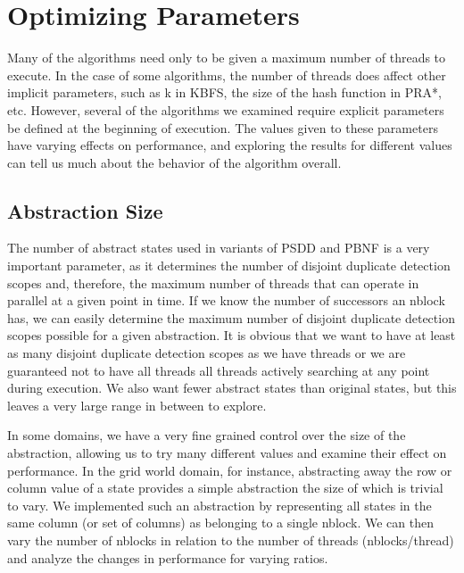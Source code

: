 \documentclass{article}
\begin{document}
\section{Optimizing Parameters}
Many of the algorithms need only to be given a maximum number of threads to execute. In the case of some algorithms, the number of threads does affect other implicit parameters, such as k in KBFS, the size of the hash function in PRA*, etc. However, several of the algorithms we examined require explicit parameters be defined at the beginning of execution. The values given to these parameters have varying effects on performance, and exploring the results for different values can tell us much about the behavior of the algorithm overall.
\subsection{Abstraction Size}
The number of abstract states used in variants of PSDD and PBNF is a very important parameter, as it determines the number of disjoint duplicate detection scopes and, therefore, the maximum number of threads that can operate in parallel at a given point in time. If we know the number of successors an nblock has, we can easily determine the maximum number of disjoint duplicate detection scopes possible for a given abstraction. It is obvious that we want to have at least as many disjoint duplicate detection scopes as we have threads or we are guaranteed not to have all threads all threads actively searching at any point during execution. We also want fewer abstract states than original states, but this leaves a very large range in between to explore.

In some domains, we have a very fine grained control over the size of the abstraction, allowing us to try many different values and examine their effect on performance. In the grid world domain, for instance, abstracting away the row or column value of a state provides a simple abstraction the size of which is trivial to vary. We implemented such an abstraction by representing all states in the same column (or set of columns) as belonging to a single nblock. We can then vary the number of nblocks in relation to the number of threads (nblocks/thread) and analyze the changes in performance for varying ratios.
\end{document}
